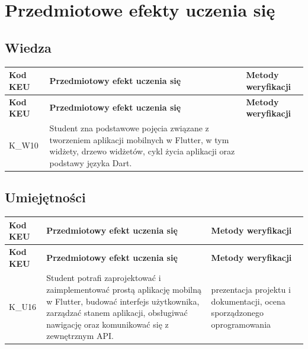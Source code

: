 \documentclass[12pt, a4paper]{article}
\newcommand{\thdrule}{\noalign{\global\setlength{\extrarowheight}{0pt}}}
\newcommand{\thdend}{\noalign{\global\setlength{\extrarowheight}{3pt}}}
\begin{document}
\section{Przedmiotowe efekty uczenia się}

\subsection*{Wiedza}
{\scriptsize
\begin{longtable}{m{1.6cm}m{9.0cm}m{4.2cm}}
\thdrule\toprule
\rowcolor{pjatkRed} {\color{white}\footnotesize\textbf{\vphantom{Ag}Kod KEU}} & {\color{white}\footnotesize\textbf{\vphantom{Ag}Przedmiotowy efekt uczenia się}} & {\color{white}\footnotesize\textbf{\vphantom{Ag}Metody weryfikacji}} \\
\midrule\thdend
\endfirsthead
\thdrule\toprule
\rowcolor{pjatkRed} {\color{white}\footnotesize\textbf{\vphantom{Ag}Kod KEU}} & {\color{white}\footnotesize\textbf{\vphantom{Ag}Przedmiotowy efekt uczenia się}} & {\color{white}\footnotesize\textbf{\vphantom{Ag}Metody weryfikacji}} \\
\midrule\thdend
\endhead
  \rowcolor{tableRowLight} K\_W10 & Student zna podstawowe pojęcia związane z tworzeniem aplikacji mobilnych w Flutter, w tym widżety, drzewo widżetów, cykl życia aplikacji oraz podstawy języka Dart. &  \\
\bottomrule
\end{longtable}}

\subsection*{Umiejętności}
{\scriptsize
\begin{longtable}{m{1.6cm}m{9.0cm}m{4.2cm}}
\thdrule\toprule
\rowcolor{pjatkRed} {\color{white}\footnotesize\textbf{\vphantom{Ag}Kod KEU}} & {\color{white}\footnotesize\textbf{\vphantom{Ag}Przedmiotowy efekt uczenia się}} & {\color{white}\footnotesize\textbf{\vphantom{Ag}Metody weryfikacji}} \\
\midrule\thdend
\endfirsthead
\thdrule\toprule
\rowcolor{pjatkRed} {\color{white}\footnotesize\textbf{\vphantom{Ag}Kod KEU}} & {\color{white}\footnotesize\textbf{\vphantom{Ag}Przedmiotowy efekt uczenia się}} & {\color{white}\footnotesize\textbf{\vphantom{Ag}Metody weryfikacji}} \\
\midrule\thdend
\endhead
  \rowcolor{tableRowLight} K\_U16 & Student potrafi zaprojektować i zaimplementować prostą aplikację mobilną w Flutter, budować interfejs użytkownika, zarządzać stanem aplikacji, obsługiwać nawigację oraz komunikować się z zewnętrznym API. & prezentacja projektu i dokumentacji, ocena sporządzonego oprogramowania \\
\bottomrule
\end{longtable}}
\end{document}
